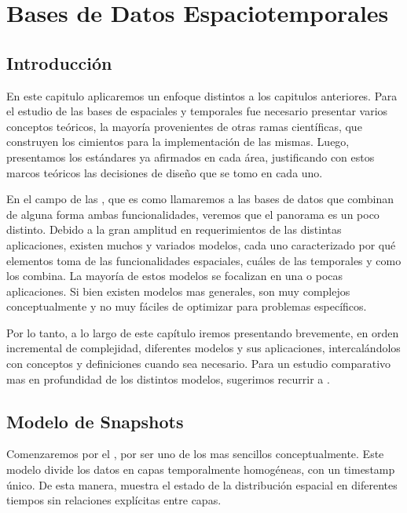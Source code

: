 \chapter{Bases de Datos Espaciotemporales}  \label{cap:et}

\section{Introducción} \label{sec:st:intro}

En este capitulo aplicaremos un enfoque distintos a los capitulos anteriores.
Para el estudio de las bases de espaciales y temporales fue necesario presentar varios conceptos teóricos,
la mayoría provenientes de otras ramas científicas,
que construyen los cimientos para la implementación de las mismas.
Luego, presentamos los estándares ya afirmados en cada área,
justificando con estos marcos teóricos las decisiones de diseño que se tomo en cada uno.

En el campo de las ,
que es como llamaremos a las bases de datos que combinan de alguna forma ambas funcionalidades,
veremos que el panorama es un poco distinto.
Debido a la gran amplitud en requerimientos de las distintas aplicaciones,
existen muchos y variados modelos, cada uno caracterizado por
qué elementos toma de las funcionalidades espaciales, cuáles de las temporales y como los combina.
La mayoría de estos modelos se focalizan en una o pocas aplicaciones.
Si bien existen modelos mas generales, son muy complejos conceptualmente
y no muy fáciles de optimizar para problemas específicos.

Por lo tanto, a lo largo de este capítulo iremos presentando brevemente, en orden incremental de complejidad,
diferentes modelos y sus aplicaciones, intercalándolos con conceptos y definiciones cuando sea necesario.
Para un estudio comparativo mas en profundidad de los distintos modelos, sugerimos recurrir a \cite{sp:litreview}.

\section{Modelo de Snapshots}

Comenzaremos por el \textsuperscript{\cite{sp:snapshot}}, por ser uno de los mas sencillos conceptualmente.
Este modelo divide los datos en capas temporalmente homogéneas, con un timestamp único.
De esta manera, muestra el estado de la distribución espacial en diferentes tiempos sin relaciones explícitas entre capas.

